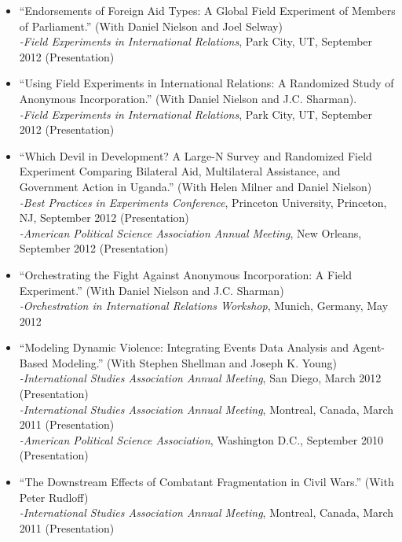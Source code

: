 \documentclass[10pt]{article}
\begin{document}
\begin{itemize}
\item ``Endorsements of Foreign Aid Types: A Global Field Experiment of Members of Parliament.'' (With Daniel Nielson and Joel Selway)
	\\ \indent \textit{-Field Experiments in International Relations}, Park City, UT, September 2012 (Presentation)

\item ``Using Field Experiments in International Relations: A Randomized Study of Anonymous Incorporation.'' (With Daniel Nielson and J.C. Sharman). 
	\\ \indent \textit{-Field Experiments in International Relations}, Park City, UT, September 2012 (Presentation)

\item ``Which Devil in Development? A Large-N Survey and Randomized Field Experiment Comparing Bilateral Aid, Multilateral Assistance, and Government Action in Uganda.'' (With Helen Milner and Daniel Nielson)
	\\ \indent \textit{-Best Practices in Experiments Conference}, Princeton University, Princeton, NJ, September 2012 (Presentation)
	\\ \indent \textit{-American Political Science Association Annual Meeting}, New Orleans, September 2012 (Presentation)

\item ``Orchestrating the Fight Against Anonymous Incorporation: A Field Experiment.'' (With Daniel Nielson and J.C. Sharman)
	\\ \indent \textit{-Orchestration in International Relations Workshop}, Munich, Germany, May 2012

\item ``Modeling Dynamic Violence: Integrating Events Data Analysis and Agent-Based Modeling.'' (With Stephen Shellman and Joseph K. Young)
	\\ \indent \textit{-International Studies Association Annual Meeting}, San Diego, March 2012 (Presentation)
	\\ \indent \textit{-International Studies Association Annual Meeting}, Montreal, Canada, March 2011 (Presentation)
	\\ \indent \textit{-American Political Science Association}, Washington D.C., September 2010 (Presentation)

\item ``The Downstream Effects of Combatant Fragmentation in Civil Wars.'' (With Peter Rudloff)
	\\ \indent \textit{-International Studies Association Annual Meeting}, Montreal, Canada, March 2011 (Presentation)


\end{itemize}
\end{document}
